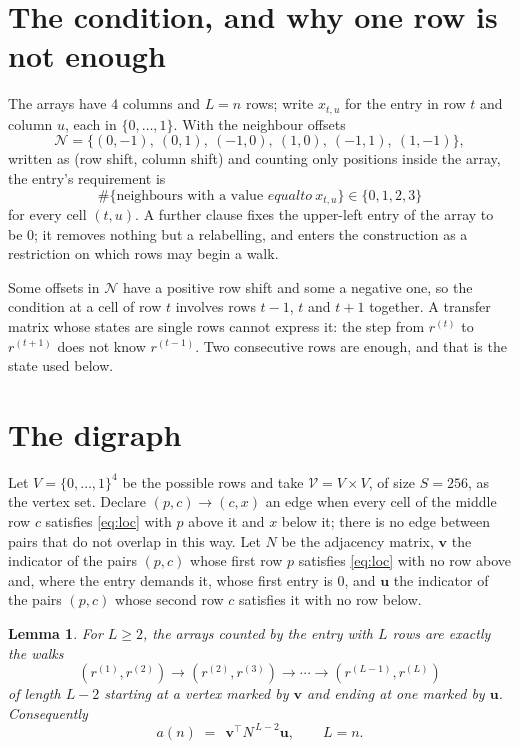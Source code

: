 \documentclass[11pt,a4paper]{article}
\theoremstyle{plain}
\newtheorem{lemma}[theorem]{Lemma}
\theoremstyle{definition}
\begin{document}
\section{The condition, and why one row is not enough}

The arrays have $4$ columns and $L=n$ rows; write $x_{t,u}$ for the entry in
row $t$ and column $u$, each in $\{0,\dots,1\}$. With the neighbour offsets
\[
\mathcal N=\{(0,-1),\ (0,1),\ (-1,0),\ (1,0),\ (-1,1),\ (1,-1)\},
\]
written as (row shift, column shift) and counting only positions inside the array, the
entry's requirement is
\begin{equation}\label{eq:loc}
\#\{\text{neighbours with a value }equal to\ x_{t,u}\}\in\{0,1,2,3\}
\end{equation}
for every cell $(t,u)$. A further clause fixes the upper-left entry of the array to be $0$; it removes nothing but a relabelling, and enters the construction as a restriction on which rows may begin a walk.

Some offsets in $\mathcal N$ have a positive row shift and some a negative one, so the
condition at a cell of row $t$ involves rows $t-1$, $t$ and $t+1$ together. A transfer
matrix whose states are single rows cannot express it: the step from $r^{(t)}$ to
$r^{(t+1)}$ does not know $r^{(t-1)}$. Two consecutive rows are enough, and that is
the state used below.

\section{The digraph}

Let $V=\{0,\dots,1\}^{4}$ be the possible rows and take
$\mathcal V=V\times V$, of size $S=256$, as the vertex set. Declare $(p,c)\to(c,x)$ an edge
when every cell of the middle row $c$ satisfies \eqref{eq:loc} with $p$ above it and $x$
below it; there is no edge between pairs that do not overlap in this way. Let $N$ be the
adjacency matrix, $\mathbf{v}$ the indicator of the pairs $(p,c)$ whose first row $p$
satisfies \eqref{eq:loc} with no row above and, where the entry demands it, whose first entry is $0$, and $\mathbf{u}$ the indicator of
the pairs $(p,c)$ whose second row $c$ satisfies it with no row below.

\begin{lemma}\label{lem:walk}
For $L\ge2$, the arrays counted by the entry with $L$ rows are exactly the walks
\[
(r^{(1)},r^{(2)})\to(r^{(2)},r^{(3)})\to\cdots\to(r^{(L-1)},r^{(L)})
\]
of length $L-2$ starting at a vertex marked by $\mathbf{v}$ and ending at one marked by
$\mathbf{u}$. Consequently
\[
a(n)\;=\;\,\mathbf{v}^{\!\top}N^{\,L-2}\mathbf{u},\qquad L=n .
\]
\end{lemma}
\end{document}

